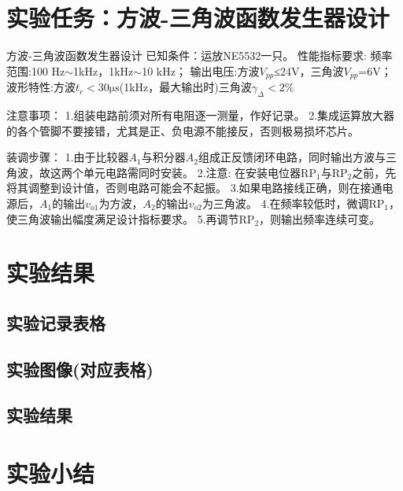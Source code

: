 \documentclass[a4paper,11pt,UTF8]{article}
\numberwithin{equation}{subsection}
\begin{document}
\section{实验任务：方波-三角波函数发生器设计}
方波-三角波函数发生器设计
已知条件：运放NE5532一只。
性能指标要求:
频率范围:100 Hz$\sim$1kHz，1kHz$\sim$10 kHz；
输出电压:方波$V_{pp}$≤24V，三角波$V_{pp}$=6V；
波形特性:方波$t_r<30\mathrm{\mu s}$(1kHz，最大输出时)三角波$\gamma_\Delta<2\%$

注意事项：
1.组装电路前须对所有电阻逐一测量，作好记录。 
2.集成运算放大器的各个管脚不要接错，尤其是正、负电源不能接反，否则极易损坏芯片。

装调步骤：
1.由于比较器$A_1$与积分器$A_2$组成正反馈闭环电路，同时输出方波与三角波，故这两个单元电路需同时安装。
2.注意: 在安装电位器RP$_1$与RP$_2$之前，先将其调整到设计值，否则电路可能会不起振。
3.如果电路接线正确，则在接通电源后，$A_1$的输出$v_{o1}$为方波，$A_2$的输出$v_{o2}$为三角波。
4.在频率较低时，微调RP$_1$，使三角波输出幅度满足设计指标要求。
5.再调节RP$_2$，则输出频率连续可变。

\section{实验结果}
\subsection{实验记录表格}
\subsection{实验图像(对应表格)}
\subsection{实验结果}
\section{实验小结}
\end{document}
